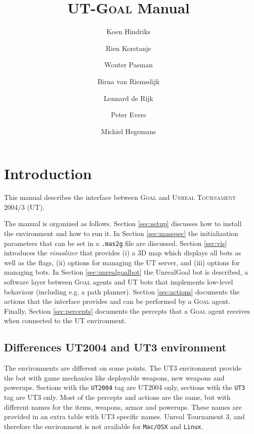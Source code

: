 \documentclass[11pt,a4paper]{article}
\newcommand{\Goal}{\textsc{Goal}}
\begin{document}
%
\title{UT-{\Goal} Manual}

%
\author{Koen Hindriks}
\author{Rien Korstanje}
\author{Wouter Pasman}
\author{Birna van Riemsdijk}
\author{Lennard de Rijk}
\author{Peter Evers}
\author{Michiel Hegemans}

%
\maketitle

\newpage

%
%
%
\section{Introduction}
%

This manual describes the interface between {\Goal} and \textsc{Unreal Tournament 2004/3} (UT).

The manual is organized as follows. Section \ref{sec:setup} discusses how to install the environment and how to run it. In Section \ref{sec:masspec} the initialization parameters that can be set in a \texttt{.mas2g} file are discussed. Section \ref{sec:vis} introduces the \emph{visualizer} that provides (i) a 3D map which displays all bots as well as the flags, (ii) options for managing the UT server, and (iii) options for managing bots. In Section \ref{sec:unrealgoalbot} the UnrealGoal bot is described, a software layer between {\Goal} agents and UT bots that implements low-level behaviour (including e.g. a path planner). Section \ref{sec:actions} documents the actions that the interface provides and can be performed by a {\Goal} agent. Finally, Section \ref{sec:percepts} documents the percepts that a {\Goal} agent receives when connected to the UT environment.

\subsection{Differences UT2004 and UT3 environment}

The environments are different on some points. The UT3 environment provide the bot with game mechanics like deployable weapons, new weapons and powerups. Sections with the \texttt{UT2004} tag are UT2004 only, sections with the \texttt{UT3} tag are UT3 only. Most of the percepts and actions are the same, but with different names for the items, weapons, armor and powerups. These names are provided in an extra table with UT3 specific names. Unreal Tournament 3, and therefore the environment is not available for \texttt{Mac/OSX} and \texttt{Linux}. 
\end{document}

